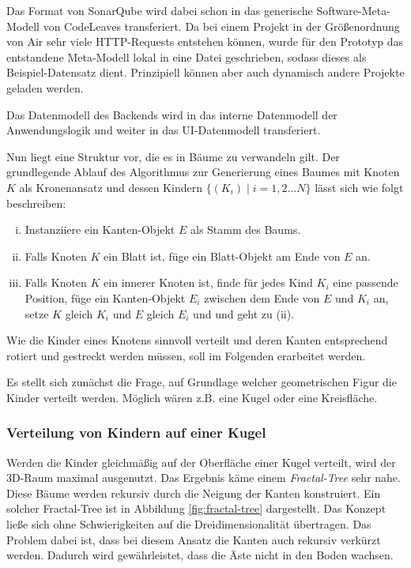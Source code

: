 Das Format von SonarQube wird dabei schon in das generische Software-Meta-Modell von CodeLeaves transferiert. Da bei einem Projekt in der Größenordnung von Air sehr viele HTTP-Requests entstehen können, wurde für den Prototyp das entstandene Meta-Modell lokal in eine Datei geschrieben, sodass dieses als Beispiel-Datensatz dient. Prinzipiell können aber auch dynamisch andere Projekte geladen werden.

Das Datenmodell des Backends wird in das interne Datenmodell der Anwendungslogik und weiter in das UI-Datenmodell transferiert.

Nun liegt eine Struktur vor, die es in Bäume zu verwandeln gilt. Der grundlegende Ablauf des Algorithmus zur Generierung eines Baumes mit Knoten $K$ als Kronenansatz und dessen Kindern $\lbrace(K_i) \mid i=1,2\hdots N\rbrace$ lässt sich wie folgt beschreiben:

\begin{enumerate}[(i), labelindent=0pt, align=left, itemsep=0pt, parsep=0pt, labelsep=.5em, leftmargin=!]
  \item Instanziiere ein Kanten-Objekt $E$ als Stamm des Baums.
  \item Falls Knoten $K$ ein Blatt ist, füge ein Blatt-Objekt am Ende von $E$ an.
  \item Falls Knoten $K$ ein innerer Knoten ist, finde für jedes Kind $K_i$ eine passende Position, füge ein Kanten-Objekt $E_i$ zwischen dem Ende von $E$ und $K_i$ an, setze $K$ gleich $K_i$ und $E$ gleich $E_i$ und und geht zu (ii).
\end{enumerate}

Wie die Kinder eines Knotens sinnvoll verteilt und deren Kanten entsprechend rotiert und gestreckt werden müssen, soll im Folgenden erarbeitet werden.

Es stellt sich zunächst die Frage, auf Grundlage welcher geometrischen Figur die Kinder verteilt werden. Möglich wären z.B. eine Kugel oder eine Kreisfläche.

\subsubsection*{Verteilung von Kindern auf einer Kugel}
Werden die Kinder gleichmäßig auf der Oberfläche einer Kugel verteilt, wird der 3D-Raum maximal ausgenutzt. Das Ergebnis käme einem \textit{Fractal-Tree} sehr nahe. Diese Bäume werden rekursiv durch die Neigung der Kanten konstruiert. Ein solcher Fractal-Tree ist in Abbildung \ref{fig:fractal-tree} dargestellt. Das Konzept ließe sich ohne Schwierigkeiten auf die Dreidimensionalität übertragen. Das Problem dabei ist, dass bei diesem Ansatz die Kanten auch rekursiv verkürzt werden. Dadurch wird gewährleistet, dass die Äste nicht in den Boden wachsen.


